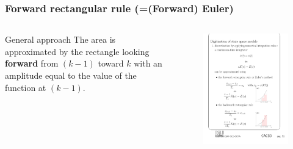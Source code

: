 \begin{frame}
	\frametitle{Forward rectangular rule (=(Forward) Euler)}
	\begin{columns}
		\begin{column}{0.5\textwidth}
		\begin{block}{General approach}
			The area is approximated by the rectangle looking \textbf{forward} from $(k-1)$ toward $k$ with an amplitude equal to the value of the function at $(k-1)$.
		\end{block}
		\end{column}
		\begin{column}{0.5\textwidth}
			\begin{figure}
				\centering
				\includegraphics[width=1\linewidth]{F_euler}
			\end{figure}
		\end{column}
	\end{columns}
\end{frame}

